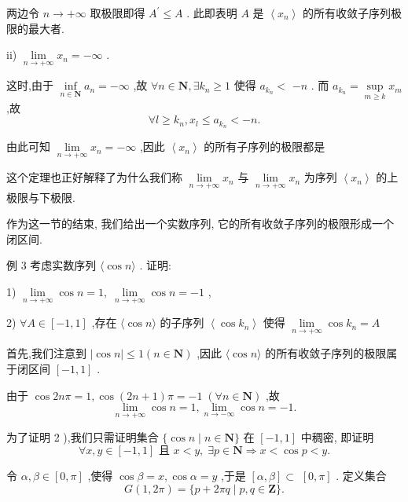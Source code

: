 两边令 $n \rightarrow   + \infty$ 取极限即得 ${A}^{\prime } \leq  A$ . 此即表明 $A$ 是 $\left\langle  {x}_{n}\right\rangle$ 的所有收敛子序列极限的最大者.

ii) $\mathop{\lim }\limits_{{n \rightarrow   + \infty }}{x}_{n} =  - \infty$ .

这时,由于 $\mathop{\inf }\limits_{{n \in  \mathbf{N}}}{a}_{n} =  - \infty$ ,故 $\forall n \in  \mathbf{N},\exists {k}_{n} \geq  1$ 使得 ${a}_{{k}_{n}} <$  $- n$ . 而 ${a}_{{k}_{n}} = \mathop{\sup }\limits_{{m \geq  k}}{x}_{m}$ ,故
$$\forall l \geq  {k}_{n},{x}_{l} \leq  {a}_{{k}_{n}} <  - n.$$

由此可知 $\mathop{\lim }\limits_{{n \rightarrow   + \infty }}{x}_{n} =  - \infty$ ,因此 $\left\langle  {x}_{n}\right\rangle$ 的所有子序列的极限都是

这个定理也正好解释了为什么我们称 $\mathop{\lim }\limits_{{n \rightarrow   + \infty }}{x}_{n}$ 与 $\mathop{\lim }\limits_{{n \rightarrow   + \infty }}{x}_{n}$ 为序列 $\left\langle  {x}_{n}\right\rangle$ 的上极限与下极限.

作为这一节的结束, 我们给出一个实数序列, 它的所有收敛子序列的极限形成一个闭区间.

例 3 考虑实数序列 $\langle \cos n\rangle$ . 证明:

1) $\mathop{\lim }\limits_{{n \rightarrow   + \infty }}\cos n = 1,\;\mathop{\lim }\limits_{{n \rightarrow   + \infty }}\cos n =  - 1$ ,

2) $\forall A \in  \left\lbrack  {-1,1}\right\rbrack$ ,存在 $\langle \cos n\rangle$ 的子序列 $\left\langle  {\cos {k}_{n}}\right\rangle$ 使得 $\mathop{\lim }\limits_{{n \rightarrow   + \infty }}\cos {k}_{n} = A$

首先,我们注意到 $\left| {\cos n}\right|  \leq  1\left( {n \in  \mathbf{N}}\right)$ ,因此 $\langle \cos n\rangle$ 的所有收敛子序列的极限属于闭区间 $\left\lbrack  {-1,1}\right\rbrack$ .

由于 $\cos {2n\pi } = 1,\cos \left( {{2n} + 1}\right) \pi  =  - 1\;\left( {\forall n \in  \mathbf{N}}\right)$ ,故
$$\mathop{\lim }\limits_{{n \rightarrow   + \infty }}\cos n = 1,\mathop{\lim }\limits_{{n \rightarrow   - \infty }}\cos n =  - 1.$$

为了证明 2 ),我们只需证明集合 $\{ \cos n \mid  n \in  \mathbf{N}\}$ 在 $\left\lbrack  {-1,1}\right\rbrack$ 中稠密, 即证明
$$\forall x,y \in  \left\lbrack  {-1,1}\right\rbrack  \text{ 且 }x < y,\;\exists p \in  \mathbf{N} \Rightarrow  x < \cos p < y.$$

令 $\alpha ,\beta  \in  \left\lbrack  {0,\pi }\right\rbrack$ ,使得 $\cos \beta  = x,\cos \alpha  = y$ ,于是 $\left\lbrack  {\alpha ,\beta }\right\rbrack   \subset$  $\left\lbrack  {0,\pi }\right\rbrack$ . 定义集合
$$G\left( {1,{2\pi }}\right)  = \{ p + {2\pi q} \mid  p,q \in  \mathbf{Z}\} .$$

